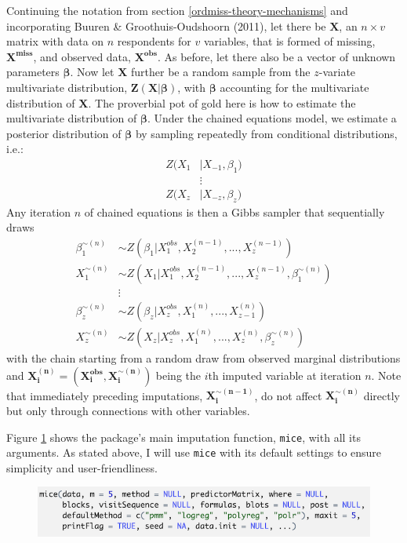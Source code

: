 \documentclass[12pt,econ]{sources/authesis}
\makeatletter
\def\maxwidth{\ifdim\Gin@nat@width>\linewidth\linewidth
\else\Gin@nat@width\fi}
\let\Oldincludegraphics\includegraphics
\renewcommand{\includegraphics}[1]{\Oldincludegraphics[width=\maxwidth]{#1}}
\def\caption{\refstepcounter\@captype \@dblarg{\@caption\@captype}}
\makeatother
\begin{document}
Continuing the notation from section \ref{ordmiss-theory-mechanisms} and incorporating Buuren \& Groothuis-Oudshoorn (2011), let there be \(\bm{X}\), an \(n \times v\) matrix with data on \(n\) respondents for \(v\) variables, that is formed of missing, \(\bm{X^{miss}}\), and observed data, \(\bm{X^{obs}}\). As before, let there also be a vector of unknown parameters \(\bm{\beta}\). Now let \(\bm{X}\) further be a random sample from the \(z\)-variate multivariate distribution, \(\bm{Z}(\bm{X} | \bm{\beta})\), with \(\bm{\beta}\) accounting for the multivariate distribution of \(\bm{X}\). The proverbial pot of gold here is how to estimate the multivariate distribution of \(\bm{\beta}\). Under the chained equations model, we estimate a posterior distribution of \(\bm{\beta}\) by sampling repeatedly from conditional distributions, i.e.:
\begin{align}
Z(X_1 &| X_{-1}, \beta_1) \nonumber\\
&\vdots \nonumber\\
Z(X_z &| X_{-z}, \beta_z)
\end{align}
Any iteration \(n\) of chained equations is then a Gibbs sampler that sequentially draws
\begin{align}
\beta_1^{\sim(n)} &\sim Z(\beta_1 | X_1^{obs}, X_2^{(n-1)}, ..., X_z^{(n-1)}) \nonumber\\
X_1^{\sim(n)} &\sim Z(X_1 | X_1^{obs}, X_2^{(n-1)}, ..., X_z^{(n-1)}, \beta_1^{\sim(n)}) \nonumber\\
&\vdots \nonumber\\
\beta_z^{\sim(n)} &\sim Z(\beta_z | X_z^{obs}, X_1^{(n)}, ..., X_{z-1}^{(n)}) \nonumber\\
X_z^{\sim(n)} &\sim Z(X_z | X_z^{obs}, X_1^{(n)}, ..., X_z^{(n)}, \beta_z^{\sim(n)})
\end{align}
with the chain starting from a random draw from observed marginal distributions and \(\bm{X_i^{(n)}} = (\bm{X_i^{obs}}, \bm{X_i^{\sim(n)}})\) being the \(i\)th imputed variable at iteration \(n\). Note that immediately preceding imputations, \(\bm{X_i^{\sim(n-1)}}\), do not affect \(\bm{X_i^{\sim(n)}}\) directly but only through connections with other variables.

Figure \ref{mice-func} shows the package's main imputation function, \texttt{mice}, with all its arguments. As stated above, I will use \texttt{mice} with its default settings to ensure simplicity and user-friendliness.

\vspace{0.5cm}
\begin{figure}[!htbp] 
  \centering
  \includegraphics{figures/mice.png}
  \caption{The \texttt{mice} Function}
  \label{mice-func}
\end{figure}
\vspace{-0.5cm}
\end{document}
